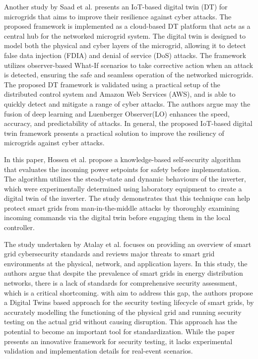 Another study by Saad et al.\cite{saadImplementationIoTBasedDigital2020} presents an IoT-based digital twin (DT) for microgrids that aims to improve their resilience against cyber attacks. The proposed framework is implemented as a cloud-based DT platform that acts as a central hub for the networked microgrid system. The digital twin is designed to model both the physical and cyber layers of the microgrid, allowing it to detect false data injection (FDIA) and denial of service (DoS) attacks. The framework utilizes observer-based What-If scenarios to take corrective action when an attack is detected, ensuring the safe and seamless operation of the networked microgrids. The proposed DT framework is validated using a practical setup of the distributed control system and Amazon Web Services (AWS), and is able to quickly detect and mitigate a range of cyber attacks. The authors argue may the fusion of deep learning and Luenberger Observer(LO) enhances the speed, accuracy, and predictability of attacks. In general, the proposed IoT-based digital twin framework presents a practical solution to improve the resiliency of microgrids against cyber attacks.

In\cite{hossenDigitalTwinSelfSecurity2021} this paper, Hossen et al. propose a knowledge-based self-security algorithm that evaluates the incoming power setpoints for safety before implementation. The algorithm utilizes the steady-state and dynamic behaviours of the inverter, which were experimentally determined using laboratory equipment to create a digital twin of the inverter. The study demonstrates that this technique can help protect smart grids from man-in-the-middle attacks by thoroughly examining incoming commands via the digital twin before engaging them in the local controller.

The study undertaken by Atalay et al.\cite{atalayDigitalTwinsApproach2020} focuses on providing an overview of smart grid cybersecurity standards and reviews major threats to smart grid environments at the physical, network, and application layers. In this study, the authors argue that despite the prevalence of smart grids in energy distribution networks, there is a lack of standards for comprehensive security assessment, which is a critical shortcoming. with aim to address this gap, the authors propose a Digital Twins based approach for the security testing lifecycle of smart grids, by accurately modelling the functioning of the physical grid and running security testing on the actual grid without causing disruption. This approach has the potential to become an important tool for standardization. While the paper presents an innovative framework for security testing, it lacks experimental validation and implementation details for real-event scenarios.


